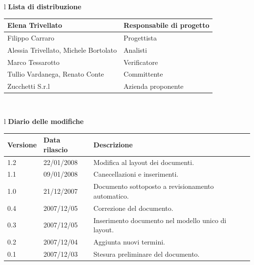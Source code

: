 \documentclass[11pt,titlepage,a4paper]{report}
\begin{document}
\begin{center}
\begin{table}[hbtp]
\large{
\begin{tabular}{l}
\Large{\textbf{\textsf{Lista di distribuzione}}} \\
\begin{tabular}{||p{6cm}||p{6cm}||} \hline
{Elena Trivellato}& Responsabile di progetto \\ \hline 
{Filippo Carraro}& Progettista \\ \hline
{Alessia Trivellato, Michele Bortolato}& Analisti \\ \hline
{Marco Tessarotto}& Verificatore \\ \hline
{Tullio Vardanega, Renato Conte}& Committente \\ \hline 
{Zucchetti S.r.l}& Azienda proponente\\ \hline
\end{tabular} \\
\end{tabular}
}
\end{table}
\begin{table}[hbtp]
\large{
\begin{tabular}{l}
\Large{\textbf{\textsf{Diario delle modifiche}}} \\
\begin{tabular}{||p{2cm}||p{3.5cm}||p{6cm}||} \hline
\textbf{Versione} & \textbf{Data rilascio} & \textbf{Descrizione} \\ \hline
1.2 & 22/01/2008 & Modifica al layout dei documenti.\\ \hline
1.1 & 09/01/2008 & Canecellazioni e inserimenti.\\ \hline
1.0 & 21/12/2007 & Documento sottoposto a revisionamento automatico.\\ \hline
0.4 & 2007/12/05 & Correzione del documento. \\ \hline
0.3 & 2007/12/05 & Inserimento documento nel modello unico di layout. \\ \hline
0.2 & 2007/12/04 & Aggiunta nuovi termini. \\ \hline
0.1 & 2007/12/03 & Stesura preliminare del documento. \\ \hline

\end{tabular} \\
\end{tabular}

}
\end{table}
\end{center}
\newpage
\end{document}
